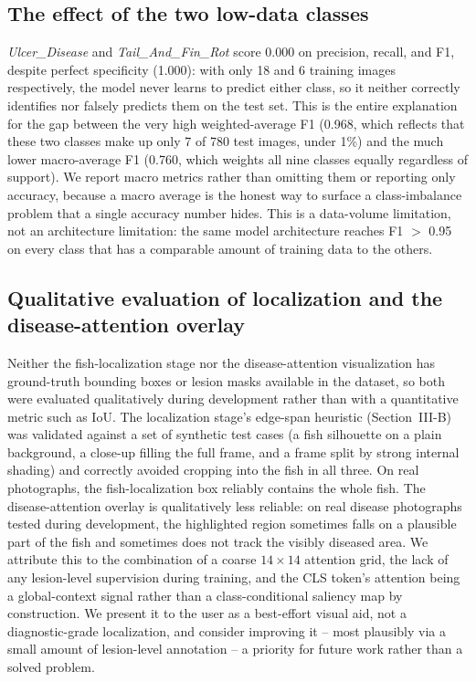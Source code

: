 \documentclass[conference]{IEEEtran}
\begin{document}
\subsection{The effect of the two low-data classes}
\emph{Ulcer\_Disease} and \emph{Tail\_And\_Fin\_Rot} score 0.000 on precision, recall, and F1, despite perfect specificity (1.000): with only 18 and 6 training images respectively, the model never learns to predict either class, so it neither correctly identifies nor falsely predicts them on the test set. This is the entire explanation for the gap between the very high weighted-average F1 (0.968, which reflects that these two classes make up only 7 of 780 test images, under 1\%) and the much lower macro-average F1 (0.760, which weights all nine classes equally regardless of support). We report macro metrics rather than omitting them or reporting only accuracy, because a macro average is the honest way to surface a class-imbalance problem that a single accuracy number hides. This is a data-volume limitation, not an architecture limitation: the same model architecture reaches F1 $>$ 0.95 on every class that has a comparable amount of training data to the others.

\subsection{Qualitative evaluation of localization and the disease-attention overlay}
Neither the fish-localization stage nor the disease-attention visualization has ground-truth bounding boxes or lesion masks available in the dataset, so both were evaluated qualitatively during development rather than with a quantitative metric such as IoU. The localization stage's edge-span heuristic (Section~III-B) was validated against a set of synthetic test cases (a fish silhouette on a plain background, a close-up filling the full frame, and a frame split by strong internal shading) and correctly avoided cropping into the fish in all three. On real photographs, the fish-localization box reliably contains the whole fish. The disease-attention overlay is qualitatively less reliable: on real disease photographs tested during development, the highlighted region sometimes falls on a plausible part of the fish and sometimes does not track the visibly diseased area. We attribute this to the combination of a coarse $14\times14$ attention grid, the lack of any lesion-level supervision during training, and the CLS token's attention being a global-context signal rather than a class-conditional saliency map by construction. We present it to the user as a best-effort visual aid, not a diagnostic-grade localization, and consider improving it -- most plausibly via a small amount of lesion-level annotation -- a priority for future work rather than a solved problem.
\end{document}
